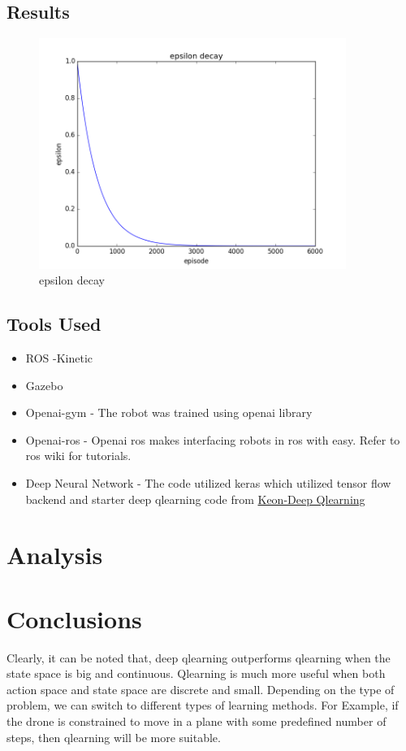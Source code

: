 \documentclass[12pt]{article}
\begin{document}
\subsection{Results}
\begin{figure}[h]
    \centering
    \includegraphics[width=10cm]{epsilon_decay}
    \caption{epsilon decay}
    \label{fig:3D environment created in matplotlib}
\end{figure}

\subsection{Tools Used}
\begin{itemize}
  \item ROS -Kinetic
  \item Gazebo 
  \item Openai-gym - The robot was trained using openai library
  \item Openai-ros - Openai ros makes interfacing robots in ros with easy. Refer to ros wiki for tutorials. 
  \item Deep Neural Network - The code utilized keras which utilized tensor flow backend and starter deep qlearning code 
    from \href{https://github.com/keon/deep-q-learning/blob/master/dqn.py}{Keon-Deep Qlearning}
\end{itemize}
\section{Analysis}
\section{Conclusions}
Clearly, it can be noted that, deep qlearning outperforms qlearning when the state space is big and continuous. Qlearning is much more useful
when both action space and state space are discrete and small. Depending on the type of problem, we can switch to different types of learning
methods. For Example, if the drone is constrained to move in a plane with some predefined number of steps, then qlearning will be more suitable.
\end{document}
